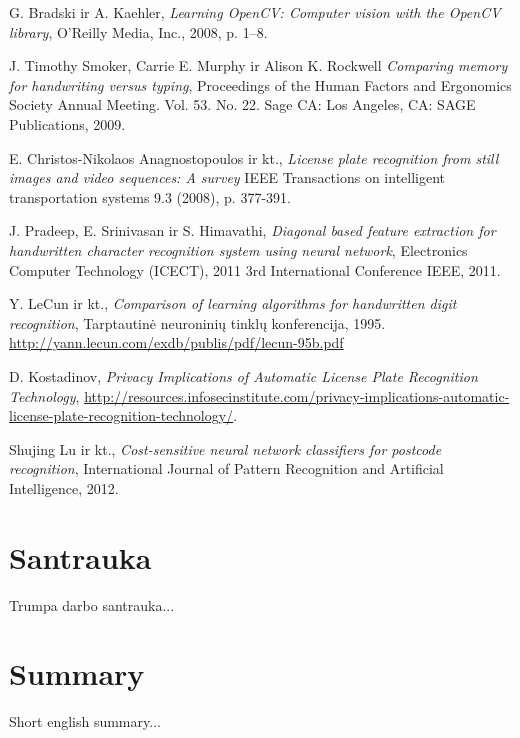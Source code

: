 \documentclass[a4paper,12pt]{article}
\begin{document}
 
\begin{thebibliography}{99}
G. Bradski ir A. Kaehler, \textit{Learning OpenCV: Computer vision with the OpenCV library}, O'Reilly Media, Inc., 2008, p. 1–8.

J. Timothy Smoker, Carrie E. Murphy ir Alison K. Rockwell \textit{Comparing memory for handwriting versus typing}, Proceedings of the Human Factors and Ergonomics Society Annual Meeting. Vol. 53. No. 22. Sage CA: Los Angeles, CA: SAGE Publications, 2009.

E. Christos-Nikolaos Anagnostopoulos ir kt., \textit{License plate recognition from still images and video sequences: A survey} IEEE Transactions on intelligent transportation systems 9.3 (2008), p. 377-391.

J. Pradeep, E. Srinivasan ir S. Himavathi, \textit{Diagonal based feature extraction for handwritten character recognition system using neural network}, Electronics Computer Technology (ICECT), 2011 3rd International Conference IEEE, 2011.
 
Y. LeCun ir kt., \textit{Comparison of learning algorithms for handwritten digit recognition}, Tarptautinė neuroninių tinklų konferencija, 1995.
\url{http://yann.lecun.com/exdb/publis/pdf/lecun-95b.pdf}

D. Kostadinov, \textit{Privacy Implications of Automatic License Plate Recognition Technology}, \url{http://resources.infosecinstitute.com/privacy-implications-automatic-license-plate-recognition-technology/}.

 Shujing Lu ir kt., \textit{Cost-sensitive neural network classifiers for postcode recognition}, International Journal of Pattern Recognition and Artificial Intelligence, 2012.
 
\end{thebibliography} 
 
 
\section*{Santrauka}
Trumpa darbo santrauka...
\section*{Summary}
Short english summary... 
\end{document}
